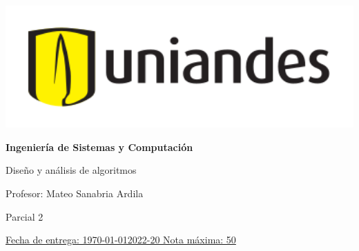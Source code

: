 \documentclass[12pt, a4paper]{exam}
\begin{document}
	\noindent
	\begin{minipage}[l]{0.1\textwidth}
		\noindent
		\includegraphics[width=1.8\textwidth]{Logosimbolo-uniandes_horizontal.png}
	\end{minipage}
\hfill
\begin{minipage}[c]{0.8\textwidth}
	\begin{center}
		{\large \textbf{Ingeniería de Sistemas y Computación} \par
		\large	Diseño y análisis de algoritmos	\par
		\small  Profesor: Mateo Sanabria Ardila	\par
		\small  Parcial 2	\par
		}
	\end{center}
\end{minipage}
\par
\vspace{0.2in}
\noindent
\uline{Fecha de entrega: \today 	\hfill  2022-20		\hfill Nota máxima: 50}
\par 
\vspace{0.15in}
\end{document}
